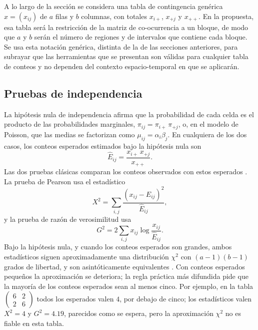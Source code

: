 A lo largo de la sección se considera una tabla de contingencia genérica
$x = (x_{ij})$ de $a$ filas y $b$ columnas, con totales $x_{i+}$, $x_{+j}$ y
$x_{++}$. En la propuesta, esa tabla será la restricción de la matriz de
co-ocurrencia a un bloque, de modo que $a$ y $b$ serán el número de regiones y de
intervalos que contiene cada bloque. Se usa esta notación genérica, distinta de la
de las secciones anteriores, para subrayar que las herramientas que se presentan
son válidas para cualquier tabla de conteos y no dependen del contexto
espacio-temporal en que se aplicarán.

\subsection{Pruebas de independencia}\label{sec:est-independencia}

La hipótesis nula de independencia afirma que la probabilidad de cada celda es el
producto de las probabilidades marginales, $\pi_{ij} = \pi_{i+}\,\pi_{+j}$, o, en
el modelo de Poisson, que las medias se factorizan como $\mu_{ij} = \alpha_i
\beta_j$. En cualquiera de los dos casos, los conteos esperados estimados bajo la
hipótesis nula son
\begin{equation}\label{eq:esperados}
  \hat{E}_{ij} = \frac{x_{i+}\, x_{+j}}{x_{++}} .
\end{equation}
Las dos pruebas clásicas comparan los conteos observados con estos esperados
\cite{Agresti2013}. La prueba de Pearson usa el estadístico
\begin{equation}\label{eq:pearson}
  X^2 = \sum_{i,j} \frac{(x_{ij} - \hat{E}_{ij})^2}{\hat{E}_{ij}} ,
\end{equation}
y la prueba de razón de verosimilitud usa
\begin{equation}\label{eq:g2}
  G^2 = 2 \sum_{i,j} x_{ij} \log \frac{x_{ij}}{\hat{E}_{ij}} .
\end{equation}
Bajo la hipótesis nula, y cuando los conteos esperados son grandes, ambos
estadísticos siguen aproximadamente una distribución $\chi^2$ con
$(a-1)(b-1)$ grados de libertad, y son asintóticamente equivalentes
\cite{Agresti2013}. Con conteos esperados pequeños la aproximación se deteriora;
la regla práctica más difundida pide que la mayoría de los conteos esperados sean
al menos cinco. Por ejemplo, en la tabla
$\begin{pmatrix} 6 & 2 \\ 2 & 6 \end{pmatrix}$ todos los esperados valen $4$, por
debajo de cinco; los estadísticos valen $X^2 = 4$ y $G^2 = 4.19$, parecidos como
se espera, pero la aproximación $\chi^2$ no es fiable en esta tabla.

